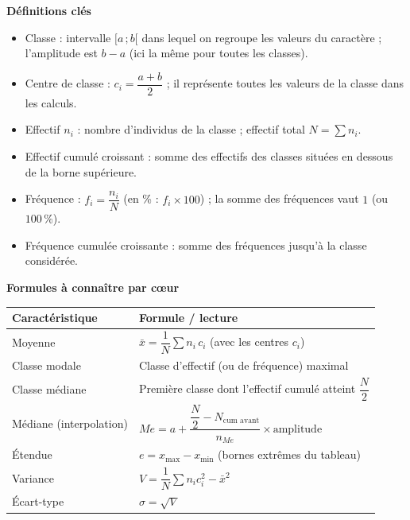 \documentclass[11pt]{article}
\newcommand{\cle}[1]{{\popxbold\color{popdark}#1}}
\begin{document}
\begin{bilan}
\textbf{Définitions clés}
\begin{itemize}
  \item \cle{Classe} : intervalle $[a\,;b[$ dans lequel on regroupe les valeurs du caractère ; l'\cle{amplitude} est $b-a$ (ici la même pour toutes les classes).
  \item \cle{Centre de classe} : $c_i=\dfrac{a+b}{2}$ ; il représente toutes les valeurs de la classe dans les calculs.
  \item \cle{Effectif} $n_i$ : nombre d'individus de la classe ; effectif total $N=\sum n_i$.
  \item \cle{Effectif cumulé croissant} : somme des effectifs des classes situées en dessous de la borne supérieure.
  \item \cle{Fréquence} : $f_i=\dfrac{n_i}{N}$ (en \% : $f_i\times 100$) ; la somme des fréquences vaut $1$ (ou $100\,\%$).
  \item \cle{Fréquence cumulée croissante} : somme des fréquences jusqu'à la classe considérée.
\end{itemize}

\textbf{Formules à connaître par cœur}
\begin{center}
\begin{tabularx}{\linewidth}{|l|X|}
\hline
\rowcolor{popblueL} \textbf{Caractéristique} & \textbf{Formule / lecture} \\
\hline
Moyenne & $\bar{x}=\dfrac{1}{N}\sum n_i\,c_i$ (avec les centres $c_i$) \\
\hline
Classe modale & Classe d'effectif (ou de fréquence) maximal \\
\hline
Classe médiane & Première classe dont l'effectif cumulé atteint $\dfrac{N}{2}$ \\
\hline
Médiane (interpolation) & $Me=a+\dfrac{\dfrac{N}{2}-N_{\text{cum avant}}}{n_{Me}}\times \text{amplitude}$ \\
\hline
Étendue & $e=x_{\max}-x_{\min}$ (bornes extrêmes du tableau) \\
\hline
Variance & $V=\dfrac{1}{N}\sum n_i c_i^2-\bar{x}^2$ \\
\hline
Écart-type & $\sigma=\sqrt{V}$ \\
\hline
\end{tabularx}
\end{center}


\end{bilan}
\end{document}
